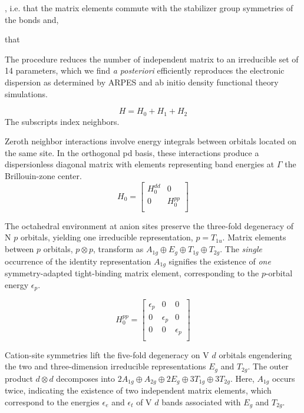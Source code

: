 \documentclass[preprint,showpacs,preprintnumbers,superscriptaddress,prb,floatfix,aps]{revtex4-1}
\begin{document}
, i.e. that the matrix elements commute with the stabilizer group symmetries of the bonds and,

 that 

The procedure reduces the number of independent matrix to an irreducible set of 14 parameters, which we find \emph{a posteriori} efficiently reproduces the electronic dispersion as determined by ARPES and ab initio density functional theory simulations.

\begin{equation}
H = H_0 + H_1 + H_2
\end{equation}
The subscripts index neighbors.

Zeroth neighbor interactions involve energy integrals between orbitals located on the same site. In the orthogonal pd basis, these interactions produce a dispersionless diagonal matrix with elements representing band energies at $\Gamma$ the Brillouin-zone center. 
\begin{equation}
H_0 =
\begin{bmatrix}
H_0^{dd} & 0 \\
 0 & H_0^{pp} \\
\end{bmatrix}
\end{equation}

The octahedral environment at anion sites preserve the three-fold degeneracy of N $p$ orbitals, yielding one irreducible representation, $p = T_{1u}$. Matrix elements between $p$ orbitals, $p \otimes p$, transform as $A_{1g} \oplus E_g \oplus T_{1g} \oplus T_{2g}$. The \emph{single} occurrence of the identity representation $A_{1g}$ signifies the existence of \emph{one} symmetry-adapted tight-binding matrix element, corresponding to the $p$-orbital energy $\epsilon_p$.

\begin{equation}
H_0^{pp} =
\begin{bmatrix}
\epsilon_{p} & 0 & 0 \\
0 & \epsilon_{p} & 0 \\
0 & 0 & \epsilon_{p} \\
\end{bmatrix}
\end{equation}

Cation-site symmetries lift the five-fold degeneracy on V $d$ orbitals engendering the two and three-dimension irreducible representations $E_g$ and $T_{2g}$. The outer product $d \otimes d$ decomposes into $2 A_{1g} \oplus A_{2g} \oplus 2 E_g \oplus 3 T_{1g} \oplus 3 T_{2g}$. Here, $A_{1g}$ occurs twice, indicating the existence of two independent matrix elements, which correspond to the energies $\epsilon_e$ and $\epsilon_t$ of V $d$ bands associated with $E_g$ and $T_{2g}$.
\end{document}
